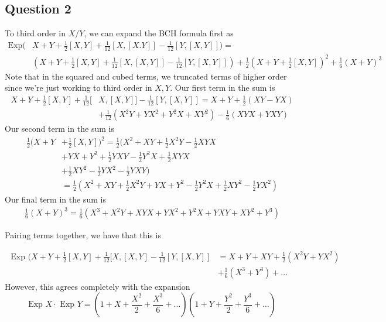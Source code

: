 \subsection{Question 2} 
To third order in $ X / Y $, we can expand the BCH formula first as 
\begin{align*}
	\text{Exp}(&  X + Y + \frac{1}{2 } [ X, Y ] + \frac{1}{12 } [ X, [ X. Y ] ]  - \frac{1}{12 } [ Y , [ X, Y ] ] ) = \\ 
    &	\left( X + Y + \frac{1}{2 } [ X, Y ] + \frac{1}{12 } [ X , [ X, Y ] ] - \frac{1}{12 } [ Y, [ X, Y ] ] \right)  + \frac{1}{2 } \left( X+ Y + \frac{1}{2 } [ X, Y ] \right) ^ 2 + \frac{1}{6}\left( X+ Y \right) ^ 3 
\end{align*}
Note that in the squared and cubed terms, we truncated terms of 
higher order since we're just working to third order in $ X, Y $.
Our first term in the sum is 
\begin{align*}
	X + Y + \frac{1}{2 } [ X , Y ] + \frac{1}{12 } [ & X, [ X, Y ] ] - \frac{1}{12 } [ Y , [ X, Y ] ] =  X + Y + \frac{1}{2 } ( XY - Y X )  \\
													&+   \frac{1}{12 } ( X^ 2 Y + Y X^ 2 + Y ^ 2 X+ X Y ^ 2 )  -\frac{1}{6 } ( XYX + YXY )  
\end{align*}
Our second term in the sum is 
\begin{align*}
	\frac{1}{2}( X + Y  & + \frac{1}{2 } [ X, Y ] )^ 2 = \frac{1}{2} ( X^ 2 + XY + \frac{1}{2 } X^ 2 Y - \frac{1}{2 } XY X    \\
			    & + Y X+ Y ^ 2 + \frac{1}{2} YXY - \frac{1}{ 2 } Y ^ 2 X + \frac{1}{2 } XYX \\
			    & + \frac{1}{2 } XY ^ 2 - \frac{1}{2 } Y X^ 2 - \frac{1}{2 } YXY ) \\
			    & = \frac{1}{2 } ( X ^ 2 + XY + \frac{1}{2 } X^2 Y + Y X + Y ^ 2 - \frac{1}{2 } Y ^ 2 X + \frac{1}{2 } XY ^ 2 - \frac{1}{2 } Y X^ 2 ) 
\end{align*}
Our final term in the sum is 
\begin{align*}
	\frac{1}{6}( X + Y ) ^ 3 = \frac{1}{6}( X^ 3 + X^2 Y + X Y X + Y X^ 2  + Y ^ 2 X + Y XY + XY ^ 2 + Y ^ 3 ) 
\end{align*}

Pairing terms together, we have that this is 

\begin{align*}
	\text{ Exp } ( X + Y + \frac{1}{2 } [ X, Y ] + \frac{1}{1 2} [ X, [ X, Y ] - \frac{1}{12 } [ Y , [ X, Y ]] & = 
	X + Y + XY + \frac{1}{2 } ( X^ 2 Y + Y X ^ 2 ) \\
														   & + \frac{1}{6 } ( X^3 + Y ^ 3 ) + \dots
\end{align*}
However, this agrees completely with the expansion 
\[
	\text{Exp } X \cdot  \text{ Exp } Y = \left(  1 + X + \frac{X^ 2 }{ 2 } + \frac{X^ 3 }{ 6}  + \dots  \right) \left( 1 + Y + \frac{ Y ^ 2 }{2 } + \frac{ Y ^ 3 }{ 6 } + \dots \right)  
\] 
